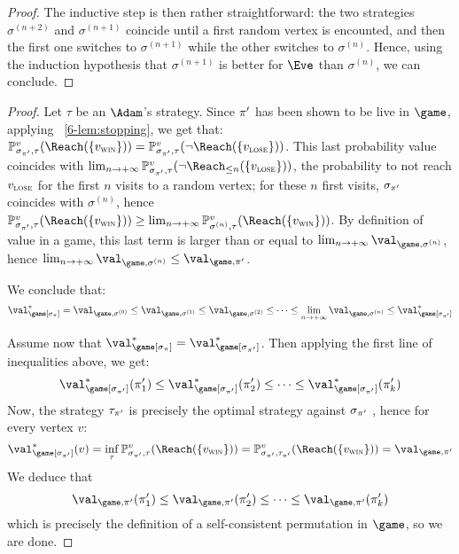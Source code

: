 \begin{proof}
  \smallskip The inductive step is then rather straightforward: the
  two strategies $\sigma^{(n+2)}$ and $\sigma^{(n+1)}$ coincide
  until a first random vertex is encounted, and then the first one
  switches to $\sigma^{(n+1)}$ while the other switches to
  $\sigma^{(n)}$. Hence, using the induction hypothesis that
  $\sigma^{(n+1)}$ is better for $\Eve$ than $\sigma^{(n)}$, we can
  conclude.
\end{proof}

\begin{proof}
Let $\tau$ be an $\Adam$'s strategy. Since $\pi'$ has been shown to
be live in $\game$, applying ~\cref{6-lem:stopping}, we
get that: $\probm^v_{\sigma_{\perm'},\tau} (\Reach(\{\vwin\})) =
\probm^v_{\sigma_{\perm'},\tau} (\neg\Reach(\{\vlose\}))$. This last
probability value coincides with $\lim_{n \to +\infty}
\probm^v_{\sigma_{\perm'},\tau} (\neg\Reach_{\le n}(\{\vlose\}))$,
the probability to not reach $v_{\textsc{lose}}$ for the first $n$ visits to a
random vertex; for these $n$ first visits, $\sigma_{\pi'}$
coincides with $\sigma^{(n)}$, hence
$\probm^v_{\sigma_{\perm'},\tau} (\Reach(\{\vwin\})) \ge \lim_{n\to
  +\infty} \probm^v_{\sigma^{(n)},\tau} (\Reach(\{\vwin\}))$. By
definition of value in a game, this last term is larger than or
equal to $\lim_{n \to+\infty}\val_{\game,\sigma^{(n)}}$, hence
$\lim_{n \to+\infty}\val_{\game,\sigma^{(n)}} \le
\val_{\game,\perm'}$.

We conclude that:
\[
\val^*_{\game[\sigma_\perm]} = \val_{\game,\sigma^{(0)}} \le
\val_{\game,\sigma^{(1)}} \le \val_{\game,\sigma^{(2)}} \le \dots\le
\lim_{n \to +\infty} \val_{\game,\sigma^{(n)}} \le
\val^*_{\game[\sigma_{\perm'}]}
\]

\medskip Assume now that $\val^*_{\game[\sigma_\perm]} =
\val^*_{\game[\sigma_{\perm'}]}$. Then applying the first line of
inequalities above, we get:
\[
\val^*_{\game[\sigma_{\perm'}]}(\perm'_1) \le
\val^*_{\game[\sigma_{\perm'}]}(\perm'_2) \le \dots \le
\val^*_{\game[\sigma_{\perm'}]}(\perm'_k)
\]
Now, the strategy $\tau_{\pi'}$ is precisely the optimal strategy
against $\sigma_{\pi'}$ , hence for every vertex $v$:
\[
\val^*_{\game[\sigma_{\perm'}]}(v) = \inf_\tau
\probm^v_{\sigma_{\perm'},\tau} (\Reach(\{\vwin\})) =
\probm^v_{\sigma_{\perm'},\tau_{\perm'}} (\Reach(\{\vwin\})) =
\val_{\game,\perm'}
\]
We deduce that
\[
\val_{\game,\perm'}(\perm'_1) \le \val_{\game,\perm'}(\perm'_2) \le
\dots \le \val_{\game,\perm'}(\perm'_k)
\]
which is precisely the definition of a self-consistent permutation
in $\game$, so we are done.
\end{proof}

